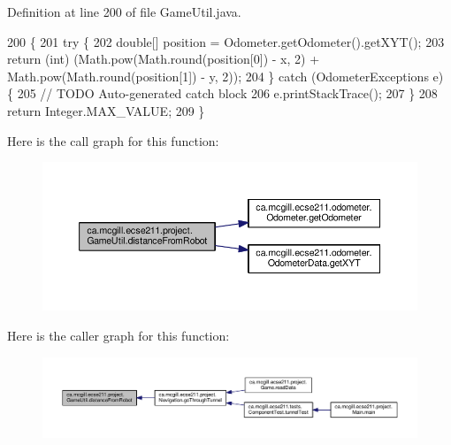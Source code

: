 Definition at line 200 of file Game\+Util.\+java.


\begin{DoxyCode}
200                                                     \{
201     \textcolor{keywordflow}{try} \{
202       \textcolor{keywordtype}{double}[] position = Odometer.getOdometer().getXYT();
203       \textcolor{keywordflow}{return} (\textcolor{keywordtype}{int}) (Math.pow(Math.round(position[0]) - x, 2) + Math.pow(Math.round(position[1]) - y, 2));
204     \} \textcolor{keywordflow}{catch} (OdometerExceptions e) \{
205       \textcolor{comment}{// TODO Auto-generated catch block}
206       e.printStackTrace();
207     \}
208     \textcolor{keywordflow}{return} Integer.MAX\_VALUE;
209   \}
\end{DoxyCode}
Here is the call graph for this function\+:
\nopagebreak
\begin{figure}[H]
\begin{center}
\leavevmode
\includegraphics[width=350pt]{classca_1_1mcgill_1_1ecse211_1_1project_1_1_game_util_a16770a5be37a6b27cc8c87e76e6d7d08_cgraph}
\end{center}
\end{figure}
Here is the caller graph for this function\+:
\nopagebreak
\begin{figure}[H]
\begin{center}
\leavevmode
\includegraphics[width=350pt]{classca_1_1mcgill_1_1ecse211_1_1project_1_1_game_util_a16770a5be37a6b27cc8c87e76e6d7d08_icgraph}
\end{center}
\end{figure}
\mbox{\label{classca_1_1mcgill_1_1ecse211_1_1project_1_1_game_util_a4b657445545fb1a814b6699724d72042}} 

